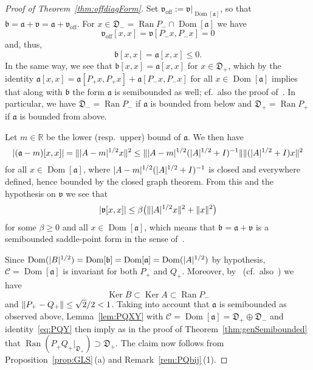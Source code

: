 \documentclass[11pt,a4paper]{amsart}
\numberwithin{equation}{section}
\DeclareMathOperator{\Ker}{Ker}
\DeclareMathOperator{\Ran}{Ran}
\DeclareMathOperator{\Dom}{Dom}
\DeclarePairedDelimiter{\abs}{|}{|}
\DeclarePairedDelimiter{\norm}{\lVert}{\rVert}
\newcommand{\RR}{\mathbb{R}}
\newcommand{\cC}{{\mathcal C}}
\newcommand{\fa}{{\mathfrak a}}
\newcommand{\fb}{{\mathfrak b}}
\newcommand{\fv}{{\mathfrak v}}
\newcommand{\fD}{{\mathfrak D}}
\theoremstyle{plain}
\theoremstyle{definition}
\theoremstyle{remark}
\begin{document}
\begin{proof}[Proof of Theorem~\ref{thm:offdiagForm}]
  Set $\fv_{\text{off}} := \fv|_{\Dom[\fa]}$, so that $\fb = \fa + \fv = \fa + \fv_{\text{off}}$. For
  $x \in \fD_- = \Ran P_- \cap \Dom[\fa]$ we have
  \begin{equation*}
    \fv_{\text{off}}[ x , x ]
    =
    \fv[ P_-x , P_-x ]
    =
    0
  \end{equation*}
  and, thus,
  \begin{equation*}
    \fb[ x , x ]
    =
    \fa[ x , x ]
    \le
    0
    .
  \end{equation*}
  In the same way, we see that $\fb[ x , x ] = \fa[ x , x ]$ for $x \in \fD_+$, which by the identity
  $\fa[ x , x ] = \fa[ P_+x , P_+x ] + \fa[ P_-x , P_-x ]$ for all $x \in \Dom[\fa]$ implies that along with $\fb$ the form $\fa$
  is semibounded as well; cf.~also the proof of~\cite[Lemma~2.7]{GKMSV17}. In particular, we have $\fD_- = \Ran P_-$ if $\fa$ is
  bounded from below and $\fD_+ = \Ran P_+$ if $\fa$ is bounded from above.

  Let $m \in \RR$ be the lower (resp.~upper) bound of $\fa$. We then have
  \begin{equation*}
    \abs{(\fa-m)[ x , x ]}
    =
    \norm{ \abs{A-m}^{1/2}x }^2
    \le
    \norm{ \abs{A-m}^{1/2}(\abs{A}^{1/2}+I)^{-1} } \norm{ (\abs{A}^{1/2}+I)x }^2
  \end{equation*}
  for all $x \in \Dom[\fa]$, where $\abs{A-m}^{1/2}(\abs{A}^{1/2}+I)^{-1}$ is closed and everywhere defined, hence bounded by the
  closed graph theorem. From this and the hypothesis on $\fv$ we see that
  \begin{equation*}
    \abs{ \fv[ x , x ] }
    \le
    \beta\bigl( \norm{\abs{A}^{1/2}x}^2 + \norm{x}^2 \bigr)
  \end{equation*}
  for some $\beta \ge 0$ and all $x \in \Dom[\fa]$, which means that $\fb = \fa + \fv$ is a semibounded saddle-point form in the
  sense of~\cite[Section~2]{GKMSV17}.

  Since $\Dom(\abs{B}^{1/2}) = \Dom[\fb] = \Dom[\fa] = \Dom(\abs{A}^{1/2})$ by hypothesis, $\cC = \Dom[\fa]$ is invariant for
  both $P_+$ and $Q_+$. Moreover, by~\cite[Theorem~3.3]{GKMSV17} (cf.~also~\cite[Theorem~2.13]{Schm15}) we have
  \begin{equation*}
    \Ker B
    \subset
    \Ker A
    \subset
    \Ran P_-
  \end{equation*}
  and $\norm{ P_+ - Q_+ } \le \sqrt{2}/2 < 1$. Taking into account that $\fa$ is semibounded as observed above,
  Lemma~\ref{lem:PQXY} with $\cC = \Dom[\fa] = \fD_+ \oplus \fD_-$ and identity~\eqref{eq:PQY} then imply as in the proof of
  Theorem~\ref{thm:genSemibounded} that $\Ran(P_+Q_+|_{\fD_+}) \supset \fD_+$. The claim now follows from
  Proposition~\ref{prop:GLS}\,(a) and Remark~\ref{rem:PQbij}\,(1).
\end{proof}%
\end{document}
